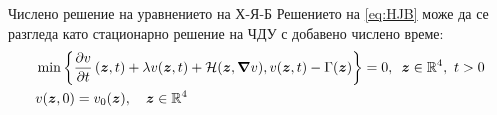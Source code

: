 \begin{frame}[c]{Числено решение на уравнението на Х-Я-Б}
  Решението на \eqref{eq:HJB} може да се разгледа като стационарно решение на ЧДУ с добавено числено време:
  \begin{equation}
    \label{eq:HJBTime}
    \begin{split}
      &\min\left\{\pdv{v}{t}\left(\boldsymbol{z}, t\right) + \lambda v(\boldsymbol{z}, t) + \mathcal{H}(\boldsymbol{z}, \grad{v}), v(\boldsymbol{z}, t) - \Gamma(\boldsymbol{z})\right\} = 0, \hspace{0.5em} \boldsymbol{z} \in \mathbb{R}^4,~ t>0 \\
      &v(\boldsymbol{z}, 0) = v_0(\boldsymbol{z}), \quad \boldsymbol{z} \in \mathbb{R}^4 \\
    \end{split}
  \end{equation}
  \end{frame}

